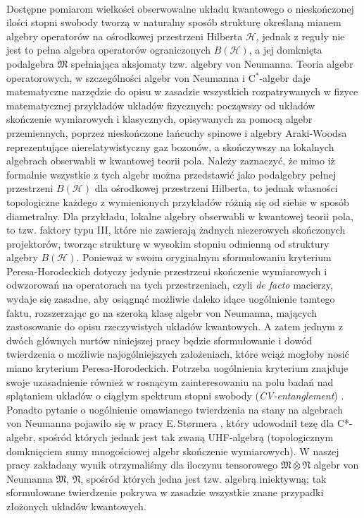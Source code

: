 \paragraph{}
\label{par:intro:02}
Dostępne pomiarom wielkości obserwowalne układu kwantowego o nieskończonej
ilości stopni swobody tworzą w naturalny sposób strukturę określaną mianem
algebry operatorów na ośrodkowej przestrzeni Hilberta $\mathcal{H}$,
jednak z reguły nie jest to pełna algebra operatorów ograniczonych
$B(\mathcal{H})$,
a jej domknięta podalgebra $\mathfrak{M}$ spełniająca aksjomaty tzw.
algebry von Neumanna.
Teoria algebr operatorowych,
w szczególności algebr von Neumanna i C$^{*}$-algebr
daje matematyczne narzędzie do opisu w zasadzie wszystkich rozpatrywanych
w fizyce matematycznej przykładów układów fizycznych:
począwszy od układów skończenie wymiarowych i klasycznych,
opisywanych za pomocą algebr przemiennych,
poprzez nieskończone łańcuchy spinowe i algebry Araki-Woodsa reprezentujące
nierelatywistyczny gaz bozonów,
a skończywszy na lokalnych algebrach obserwabli w kwantowej teorii pola.
Należy zaznaczyć,
że mimo iż formalnie wszystkie z tych algebr można przedstawić jako
podalgebry pełnej przestrzeni $B(\mathcal{H})$ dla ośrodkowej przestrzeni Hilberta,
to jednak własności topologiczne każdego z wymienionych przykładów
różnią się od siebie w sposób diametralny.
Dla przykładu, lokalne algebry obserwabli w kwantowej teorii pola,
to tzw. faktory typu III,
które nie zawierają żadnych niezerowych skończonych projektorów,
tworząc strukturę w wysokim stopniu odmienną od struktury algebry $B(\mathcal{H})$.
Ponieważ w swoim oryginalnym sformułowaniu kryterium Peresa-Horodeckich
dotyczy jedynie przestrzeni skończenie wymiarowych i odwzorowań na operatorach
na tych przestrzeniach,
czyli \emph{de facto} macierzy,
wydaje się zasadne,
aby osiągnąć możliwie daleko idące uogólnienie tamtego faktu,
rozszerzając go na szeroką klasę algebr von Neumanna,
mających zastosowanie do opisu rzeczywistych układów kwantowych.
A zatem jednym z dwóch głównych nurtów niniejszej pracy będzie sformułowanie
i dowód twierdzenia o możliwie najogólniejszych założeniach,
które wciąż mogłoby nosić miano kryterium Peresa-Horodeckich.
Potrzeba uogólnienia kryterium znajduje swoje uzasadnienie również 
w rosnącym zainteresowaniu na polu badań nad splątaniem układów o ciągłym
spektrum stopni swobody (\emph{CV-entanglement})
\cite{adesso2007entanglement}.
Ponadto pytanie o uogólnienie omawianego twierdzenia na stany na algebrach
von Neumanna pojawiło się w pracy E.\,St{\o}rmera
\cite{stormer2008separable},
który udowodnił tezę dla C*-algebr, spośród których jednak jest tak zwaną
UHF-algebrą 
(topologicznym domknięciem sumy mnogościowej algebr skończenie wymiarowych).
W naszej pracy zakładany wynik otrzymaliśmy dla iloczynu tensorowego
$\mathfrak{M} \bar{\otimes} \mathfrak{N}$ 
algebr von Neumanna $\mathfrak{M}$, $\mathfrak{N}$,
spośród których jedna jest tzw. algebrą iniektywną;
tak sformułowane twierdzenie pokrywa w zasadzie wszystkie znane
przypadki złożonych układów kwantowych.

